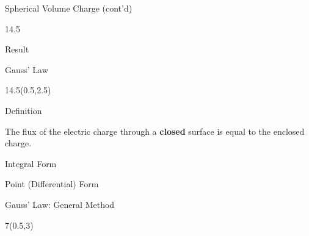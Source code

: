 \begin{lesson20}
\begin{frame}{Spherical Volume Charge (cont'd)}
\begin{textblock}{14.5}
\vspace{-18pt}
\begin{myblock}[0.9]{Result}
\vspace{-12pt}
\vspace{-12pt}
\end{myblock}
\end{textblock}
\end{frame}



\end{lesson20}



\begin{lesson21}
\begin{frame}{Gauss' Law}
\begin{textblock}{14.5}(0.5,2.5)

\begin{myblock}[0.9]{Definition}

The flux of the electric charge through a \textbf{closed} surface is equal to the enclosed charge.

\end{myblock}

\vspace{-12pt}

\begin{myblock}[0.9]{Integral Form}
\vspace{-12pt}
\vspace{-12pt}
\end{myblock}

\begin{myblock}[0.9]{Point (Differential) Form}
\vspace{-12pt}
\vspace{-12pt}
\end{myblock}

\end{textblock}
\end{frame}

\begin{frame}{Gauss' Law: General Method}
\begin{textblock}{7}(0.5,3)


\end{textblock}
\end{frame}
\end{lesson21}
